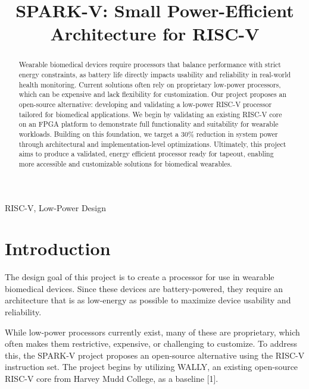 \documentclass[conference]{IEEEtran}
\begin{document}
\title{SPARK-V: Small Power-Efficient Architecture for RISC-V}


\author{
}

\maketitle

\begin{abstract}
Wearable biomedical devices require processors that balance performance with strict energy constraints, as battery life directly impacts usability and reliability in real-world health monitoring. Current solutions often rely on proprietary low-power processors, which can be expensive and lack flexibility for customization. Our project proposes an open-source alternative: developing and validating a low-power RISC-V processor tailored for biomedical applications. We begin by validating an existing RISC-V core on an FPGA platform to demonstrate full functionality and suitability for wearable workloads. Building on this foundation, we target a 30\% reduction in system power through architectural and implementation-level optimizations. Ultimately, this project aims to produce a validated, energy efficient processor ready for tapeout, enabling more accessible and customizable solutions for biomedical wearables.
\end{abstract}

\begin{IEEEkeywords}
RISC-V, Low-Power Design
\end{IEEEkeywords}

\section{Introduction}
The design goal of this project is to create a processor for use in wearable biomedical devices. Since these devices are battery-powered, they require an architecture that is as low-energy as possible to maximize device usability and reliability.

While low-power processors currently exist, many of these are proprietary, which often makes them restrictive, expensive, or challenging to customize. To address this, the SPARK-V project proposes an open-source alternative using the RISC-V instruction set. The project begins by utilizing WALLY, an existing open-source RISC-V core from Harvey Mudd College, as a baseline [1].
\end{document}
